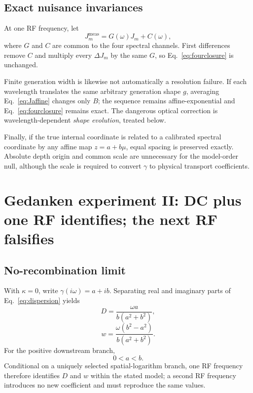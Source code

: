 \documentclass[11pt]{article}
\begin{document}
\subsection{Exact nuisance invariances}

At one RF frequency, let
\begin{equation}
J_m^{\mathrm{meas}}=G(\omega)J_m+C(\omega),
\end{equation}
where $G$ and $C$ are common to the four spectral channels. First differences remove $C$ and multiply every $\Delta J_m$ by the same $G$, so Eq.~\eqref{eq:fourclosure} is unchanged.

Finite generation width is likewise not automatically a resolution failure. If each wavelength translates the same arbitrary generation shape $g$, averaging Eq.~\eqref{eq:Jaffine} changes only $B$; the sequence remains affine-exponential and Eq.~\eqref{eq:fourclosure} remains exact. The dangerous optical correction is wavelength-dependent \emph{shape evolution}, treated below.

Finally, if the true internal coordinate is related to a calibrated spectral coordinate by any affine map $z=a+b\mu$, equal spacing is preserved exactly. Absolute depth origin and common scale are unnecessary for the model-order null, although the scale is required to convert $\gamma$ to physical transport coefficients.

\section{Gedanken experiment II: DC plus one RF identifies; the next RF falsifies}

\subsection{No-recombination limit}

With $\kappa=0$, write $\gamma(i\omega)=a+ib$. Separating real and imaginary parts of Eq.~\eqref{eq:dispersion} yields
\begin{equation}
\boxed{D=\frac{\omega a}{b(a^2+b^2)},}
\label{eq:Dsimple}
\end{equation}
\begin{equation}
\boxed{w=\frac{\omega(b^2-a^2)}{b(a^2+b^2)}.}
\label{eq:wsimple}
\end{equation}
For the positive downstream branch,
\begin{equation}
\boxed{0<a<b.}
\end{equation}
Conditional on a uniquely selected spatial-logarithm branch, one RF frequency therefore identifies $D$ and $w$ within the stated model; a second RF frequency introduces no new coefficient and must reproduce the same values.
\end{document}
